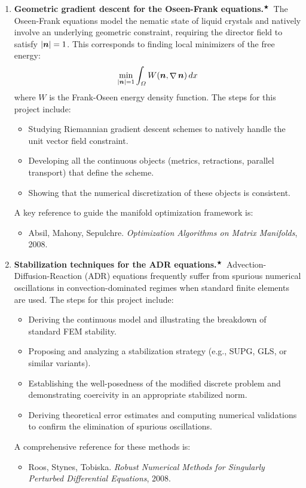 \documentclass{article}
\renewcommand{\vec}{\vectorsym}
\DeclareMathOperator{\grad}{\nabla}
\newcommand{\master}{$^\bigstar$}
\begin{document}
\begin{enumerate}
    \item \textbf{Geometric gradient descent for the Oseen-Frank equations.}\master\ The Oseen-Frank equations model the nematic state of liquid crystals and natively involve an underlying geometric constraint, requiring the director field to satisfy $|\vec n| = 1$. This corresponds to finding local minimizers of the free energy:
        $$ \min_{|\vec n| = 1} \int_\Omega W(\vec n, \grad \vec n) \, dx $$
        where $W$ is the Frank-Oseen energy density function. 
        The steps for this project include:
        \begin{itemize}
            \item Studying Riemannian gradient descent schemes to natively handle the unit vector field constraint.
            \item Developing all the continuous objects (metrics, retractions, parallel transport) that define the scheme.
            \item Showing that the numerical discretization of these objects is consistent.
        \end{itemize}
        A key reference to guide the manifold optimization framework is:
        \begin{itemize}
            \item Absil, Mahony, Sepulchre. \emph{Optimization Algorithms on Matrix Manifolds}, 2008.
        \end{itemize}

    \item \textbf{Stabilization techniques for the ADR equations.}\master\ Advection-Diffusion-Reaction (ADR) equations frequently suffer from spurious numerical oscillations in convection-dominated regimes when standard finite elements are used. 
    The steps for this project include:
        \begin{itemize}
            \item Deriving the continuous model and illustrating the breakdown of standard FEM stability.
            \item Proposing and analyzing a stabilization strategy (e.g., SUPG, GLS, or similar variants).
            \item Establishing the well-posedness of the modified discrete problem and demonstrating coercivity in an appropriate stabilized norm.
            \item Deriving theoretical error estimates and computing numerical validations to confirm the elimination of spurious oscillations.
        \end{itemize}
        A comprehensive reference for these methods is:
        \begin{itemize}
            \item Roos, Stynes, Tobiska. \emph{Robust Numerical Methods for Singularly Perturbed Differential Equations}, 2008.
        \end{itemize}
\end{enumerate}
\end{document}

